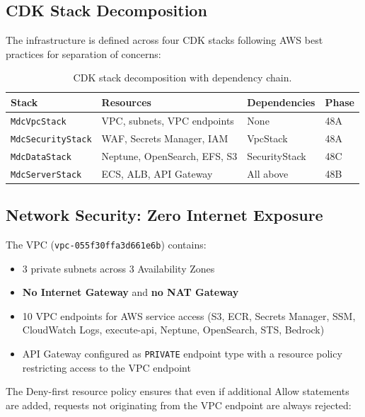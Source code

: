 \documentclass[11pt,letterpaper]{article}
\begin{document}
\subsection{CDK Stack Decomposition}

The infrastructure is defined across four CDK stacks following AWS
best practices for separation of concerns:

\begin{table}[H]
\centering
\footnotesize
\begin{tabular}{@{}llll@{}}
\toprule
\textbf{Stack} & \textbf{Resources} & \textbf{Dependencies} & \textbf{Phase} \\
\midrule
\texttt{MdcVpcStack} & VPC, subnets, VPC endpoints & None & 48A \\
\texttt{MdcSecurityStack} & WAF, Secrets Manager, IAM & VpcStack & 48A \\
\texttt{MdcDataStack} & Neptune, OpenSearch, EFS, S3 & SecurityStack & 48C \\
\texttt{MdcServerStack} & ECS, ALB, API Gateway & All above & 48B \\
\bottomrule
\end{tabular}
\caption{CDK stack decomposition with dependency chain.}
\label{tab:cdk-stacks}
\end{table}

\subsection{Network Security: Zero Internet Exposure}

The VPC (\texttt{vpc-055f30ffa3d661e6b}) contains:
\begin{itemize}[noitemsep]
    \item 3 private subnets across 3 Availability Zones
    \item \textbf{No Internet Gateway} and \textbf{no NAT Gateway}
    \item 10 VPC endpoints for AWS service access (S3, ECR, Secrets Manager,
          SSM, CloudWatch Logs, execute-api, Neptune, OpenSearch, STS, Bedrock)
    \item API Gateway configured as \texttt{PRIVATE} endpoint type with a
          resource policy restricting access to the VPC endpoint
\end{itemize}

The Deny-first resource policy ensures that even if additional Allow
statements are added, requests not originating from the VPC endpoint are
always rejected:
\end{document}
